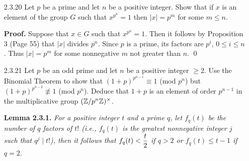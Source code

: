 \begin{enumerate}
      \textbf{Proof.} Let $H$ be a group and let $h \in H$. First we shall show
      that there exists a homomorphism from $\Z$ to $H$ such that $1 \mapsto h$.
      So consider the map $\alpha : \Z \rightarrow H$ defined by
      $n \mapsto h^n$. Clearly $\alpha(1) = h$ and
      $$\alpha(x+y) = h^{x+y} = h^xh^y = \alpha(x)\alpha(y) \text{ for all }
        x, y \in \Z,$$
      so that $\alpha$ is a homomorphism. To show uniqueness, suppose that
      $\alpha' : \Z \rightarrow H$ is an homomorphism such that
      $\alpha'(1) = h$. Then according to Exercise 1.6.1, we have that
      $\alpha'(n) = \alpha'(n\cdot1) = \alpha'(1)^n = h^n$ for all $n \in \Z$;
      that is, $\alpha' = \alpha$, as desired. \qed
   \item[2.3.20]  Let $p$ be a prime and let $n$ be a positive integer. Show
                  that if $x$ is an element of the group $G$ such that
                  $x^{p^n} = 1$ then $|x| = p^m$ for some $m \le n$.
                  
      \textbf{Proof.} Suppose that $x \in G$ such that $x^{p^n} = 1$. Then it
      follows by Proposition 3 (Page 55) that $|x|$ divides $p^n$. Since $p$ is
      a prime, its factors are $p^i$, $0 \le i \le n$. Thus $|x| = p^m$ for
      some nonnegative $m$ not greater than $n$. \qed
   \item[2.3.21]  Let $p$ be an odd prime and let $n$ be a positive integer
                  $\ge 2$. Use the Binomial Theorem to show that
                  $(1+p)^{p^{n-1}} \equiv 1$ (mod $p^n$) but
                  $(1+p)^{p^{n-2}} \not\equiv 1$ (mod $p^n$). Deduce that $1+p$
                  is an element of order $p^{n-1}$ in the multiplicative group
                  $(\mathbb{Z}/p^n\mathbb{Z})^\times$.

      \textbf{Lemma 2.3.1.} \textit{For a positive integer $t$ and a prime $q$, 
      let $f_q(t)$ be the number of $q$ factors of $t!$ (i.e., $f_q(t)$ is
      the greatest nonnegative integer $j$ such that $q^j \mid t!$), then it 
      follows that $f_q(t) < \displaystyle\frac{t}{2}$ if $q > 2$ or $f_q(t) \le t - 1$ if
      $q = 2$}.


\end{enumerate}
